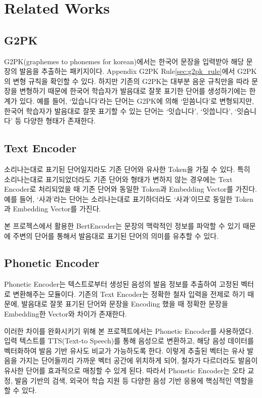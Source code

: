 \documentclass[letterpaper]{article} %
\begin{document}
\section{Related Works}
\subsection{G2PK}
G2PK(graphemes to phonemes for korean)에서는 한국어 문장을 입력받아 해당 문장의 발음을 추출하는 패키지이다.
Appendix G2PK Rule\ref{sec:g2pk_rule}에서 G2PK의 변형 규칙을 확인할 수 있다.
하지만 기존의 G2PK는 대부분 음운 규칙만을 따라 문장을 변형하기 때문에 한국어 학습자가 발음대로 잘못 표기한 단어를 생성하기에는 한계가 있다.
예를 들어, `있습니다'라는 단어는 G2PK에 의해 `읻씀니다'로 변형되지만, 한국어 학습자가 발음대로 잘못 표기할 수 있는 단어는 `잇습니다', `잇씁니다', `잇슴니다' 등 다양한 형태가 존재한다.

\subsection{Text Encoder}
소리나는대로 표기된 단어일지라도 기존 단어와 유사한 Token을 가질 수 있다. 
특히 소리나는대로 표기되었더라도 기존 단어와 형태가 변하지 않는 경우에는 Text Encoder로 처리되었을 때 기존 단어와 동일한 Token과 Embedding Vector를 가진다. 
예를 들어, `사과'라는 단어는 소리나는대로 표기하더라도 `사과'이므로 동일한 Token과 Embedding Vector를 가진다.

본 프로젝스에서 활용한 BertEncoder는 문장의 맥락적인 정보를 파악할 수 있기 때문에 주변의 단어를 통해서 발음대로 표기된 단어의 의미를 유추할 수 있다.

\subsection{Phonetic Encoder}
Phonetic Encoder는 텍스트로부터 생성된 음성의 발음 정보를 추출하여 고정된 벡터로 변환해주는 모듈이다.
기존의 Text Encoder는 정확한 철자 입력을 전제로 하기 때문에, 발음대로 잘못 표기된 단어와 문장을 Encoding 했을 때 정확한 문장을 Embedding한 Vector와 차이가 존재한다.

이러한 차이를 완화시키기 위해 본 프로젝트에서는 Phonetic Encoder를 사용하였다. 입력 텍스트를 TTS(Text-to Speech)를 통해 음성으로 변환하고, 해당 음성 데이터를 벡터화하여 발음 기반 유사도 비교가 가능하도록 한다. 이렇게 추출된 벡터는 유사 발음을 가지는 단어들끼리 가까운 벡터 공간에 위치하게 되어, 철자가 다르더라도 발음이 유사한 단어를 효과적으로 매칭할 수 있게 된다. 따라서 Phonetic Encoder는 오타 교정, 발음 기반의 검색, 외국어 학습 지원 등 다양한 음성 기반 응용에 핵심적인 역할을 할 수 있다.
\end{document}
